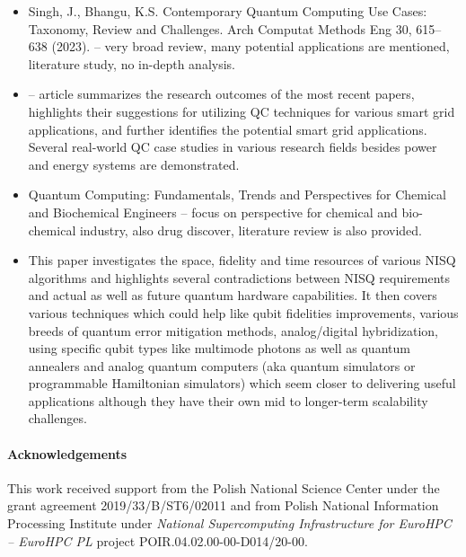 \documentclass[a4paper,11pt]{article}
\begin{document}
\begin{itemize}
\item Singh, J., Bhangu, K.S. Contemporary Quantum Computing Use Cases: Taxonomy, Review and Challenges. Arch Computat Methods Eng 30, 615–638 (2023).  \cite{singh2022contemporary} -- very broad review, many potential applications are mentioned, literature study, no in-depth analysis.

\item \cite{ullah2022quantum} -- article summarizes the research outcomes of the most recent papers, highlights their suggestions for utilizing QC techniques for various smart grid applications, and further identifies the potential smart grid applications. Several real-world QC case studies in various research fields besides power and energy systems are demonstrated.

\item Quantum Computing: Fundamentals, Trends and Perspectives for Chemical and Biochemical Engineers \cite{nourbakhsh2022quantum} -- focus on perspective for chemical and bio-chemical industry, also drug discover, literature review is also provided.

\item This paper investigates the space, fidelity and time resources of various NISQ algorithms and highlights several contradictions between NISQ requirements and actual as well as future quantum hardware capabilities. It then covers various techniques which could help like qubit fidelities improvements, various breeds of quantum error mitigation methods, analog/digital hybridization, using specific qubit types like multimode photons as well as quantum annealers and analog quantum computers (aka quantum simulators or programmable Hamiltonian simulators) which seem closer to delivering useful applications although they have their own mid to longer-term scalability challenges.  \cite{ezratty2023where}
\end{itemize}

\paragraph{Acknowledgements}
This work received support from the Polish National Science Center under the grant agreement 2019/33/B/ST6/02011 and from Polish National Information Processing Institute  under \emph{National Supercomputing Infrastructure for EuroHPC -- EuroHPC PL} project POIR.04.02.00-00-D014/20-00.



\end{document}
